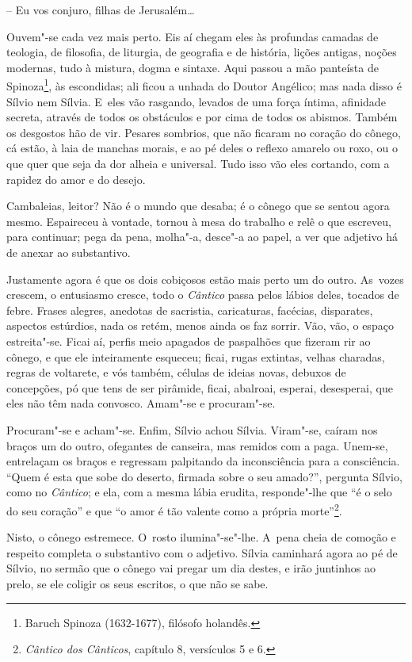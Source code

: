 -- Eu vos conjuro, filhas de Jerusalém\ldots{}

Ouvem"-se cada vez mais perto. Eis aí chegam eles às profundas camadas de
teologia, de filosofia, de liturgia, de geografia e de história, lições
antigas, noções modernas, tudo à mistura, dogma e sintaxe. Aqui passou a
mão panteísta de Spinoza\footnote{Baruch Spinoza (1632-1677), filósofo
  holandês.}, às escondidas; ali ficou a unhada do Doutor Angélico; mas
nada disso é Sílvio nem Sílvia. E~eles vão rasgando, levados de uma
força íntima, afinidade secreta, através de todos os obstáculos e por
cima de todos os abismos. Também os desgostos hão de vir. Pesares
sombrios, que não ficaram no coração do cônego, cá estão, à laia de
manchas morais, e ao pé deles o reflexo amarelo ou roxo, ou o que quer
que seja da dor alheia e universal. Tudo isso vão eles cortando, com a
rapidez do amor e do desejo.

Cambaleias, leitor? Não é o mundo que desaba; é o cônego que se sentou
agora mesmo. Espaireceu à vontade, tornou à mesa do trabalho e relê o
que escreveu, para continuar; pega da pena, molha"-a, desce"-a ao papel, a
ver que adjetivo há de anexar ao substantivo.

Justamente agora é que os dois cobiçosos estão mais perto um do outro.
As~vozes crescem, o entusiasmo cresce, todo o \emph{Cântico} passa pelos
lábios deles, tocados de febre. Frases alegres, anedotas de sacristia,
caricaturas, facécias, disparates, aspectos estúrdios, nada os retém,
menos ainda os faz sorrir. Vão, vão, o espaço estreita"-se. Ficai aí,
perfis meio apagados de paspalhões que fizeram rir ao cônego, e que ele
inteiramente esqueceu; ficai, rugas extintas, velhas charadas, regras de
voltarete, e vós também, células de ideias novas, debuxos de concepções,
pó que tens de ser pirâmide, ficai, abalroai, esperai, desesperai, que
eles não têm nada convosco. Amam"-se e procuram"-se.

Procuram"-se e acham"-se. Enfim, Sílvio achou Sílvia. Viram"-se, caíram nos
braços um do outro, ofegantes de canseira, mas remidos com a paga. Unem-se,
entrelaçam os braços e regressam palpitando da inconsciência para a
consciência. ``Quem é esta que sobe do deserto, firmada sobre o seu
amado?'', pergunta Sílvio, como no \emph{Cântico}; e ela, com a mesma
lábia erudita, responde"-lhe que ``é o selo do seu coração'' e que ``o
amor é tão valente como a própria morte''\footnote{\emph{Cântico dos
  Cânticos}, capítulo 8, versículos 5 e 6.}.

Nisto, o cônego estremece. O~rosto ilumina"-se"-lhe. A~pena cheia de
comoção e respeito completa o substantivo com o adjetivo. Sílvia
caminhará agora ao pé de Sílvio, no sermão que o cônego vai pregar um
dia destes, e irão juntinhos ao prelo, se ele coligir os seus escritos,
o que não se sabe.

